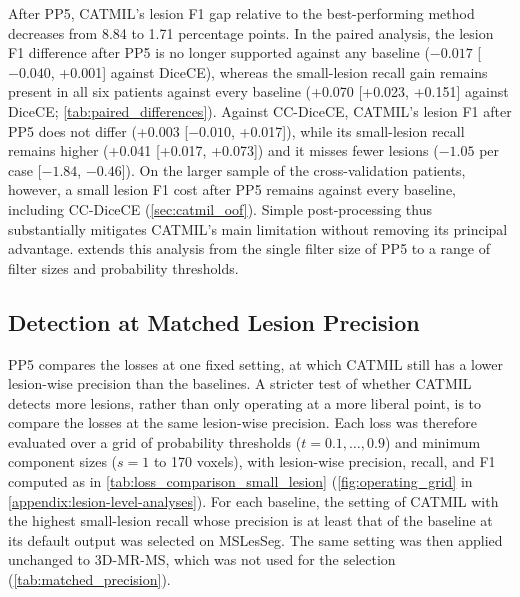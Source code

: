 After PP5, CATMIL's lesion F1 gap relative to the best-performing method
decreases from 8.84 to 1.71 percentage points. In the paired analysis, the
lesion F1 difference after PP5 is no longer supported against any baseline
($-0.017$ [$-0.040$, +0.001] against DiceCE), whereas the small-lesion
recall gain remains present in all six patients against every baseline
(+0.070 [+0.023, +0.151] against DiceCE; \cref{tab:paired_differences}).
Against CC-DiceCE, CATMIL's lesion F1 after PP5 does not differ (+0.003
[$-0.010$, +0.017]), while its small-lesion recall remains higher (+0.041
[+0.017, +0.073]) and it misses fewer lesions ($-1.05$ per case [$-1.84$,
$-0.46$]). On the larger sample of the cross-validation patients, however,
a small lesion F1 cost after PP5 remains against every baseline, including
CC-DiceCE (\cref{sec:catmil_oof}).
Simple post-processing thus substantially mitigates CATMIL's main
limitation without removing its principal advantage.
 extends this analysis from the single
filter size of PP5 to a range of filter sizes and probability thresholds.

\subsection{Detection at Matched Lesion Precision}
\label{sec:matched_precision}

PP5 compares the losses at one fixed setting, at which CATMIL still has a
lower lesion-wise precision than the baselines. A stricter test of whether
CATMIL detects more lesions, rather than only operating at a more liberal
point, is to compare the losses at the same lesion-wise precision. Each
loss was therefore evaluated over a grid of probability thresholds
($t = 0.1, \dots, 0.9$) and minimum component sizes ($s = 1$ to 170
voxels), with lesion-wise precision, recall, and F1 computed as in
\cref{tab:loss_comparison_small_lesion}
(\cref{fig:operating_grid} in \cref{appendix:lesion-level-analyses}). For
each baseline, the setting of CATMIL with the highest small-lesion recall
whose precision is at least that of the baseline at its default output was
selected on MSLesSeg. The same setting was then applied unchanged to
3D-MR-MS, which was not used for the selection
(\cref{tab:matched_precision}).

